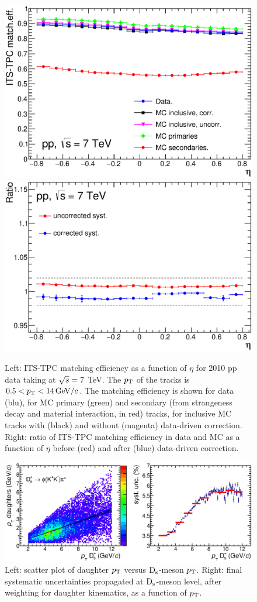 \begin{figure}[!htb]
\begin{center}
\includegraphics[width=.49\textwidth]{FigCap4/ITSTPCmatchEff_10bpass4_vsEta.eps}
\includegraphics[width=.49\textwidth]{FigCap4/ITSTPCmatchEffSyst_10bpass4_vsEta.eps}
\caption{Left: ITS-TPC matching efficiency as a function of $\eta$ for 2010 pp data taking at $\sqrt{s} = 7$ TeV. The $p_{\rm T}$ of the tracks is \mbox{$0.5 < p_{\rm T} < 14 \, \mathrm{GeV}/c$}. The matching efficiency is shown for data (blu), for MC primary (green) and secondary (from strangeness decay and material interaction, in red) tracks, for inclusive MC tracks with (black) and without (magenta) data-driven correction. Right: ratio of ITS-TPC matching efficiency in data and MC as a function of $\eta$ before (red) and after (blue) data-driven correction.}
\label{fig:CorrMatchEffVsEta}
\end{center}
\end{figure}


\begin{figure}[!htb]
\begin{center}
\includegraphics[width=1\textwidth]{FigCap4/FinalSystMEDmesons_ppPass4.eps}
\caption{Left: scatter plot of daughter $p_{\rm T}$ versus ${\rm D_s}$-meson $p_{\rm T}$. Right: final systematic uncertainties propagated at ${\rm D_s}$-meson level, after weighting for daughter kinematics, as a function of $p_{\rm T}$.}
\label{fig:SysMatchEffDmeson}
\end{center}
\end{figure}

